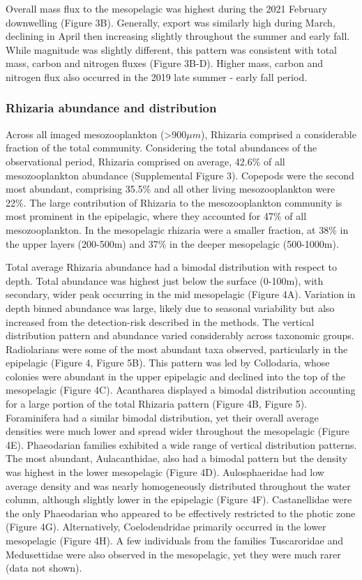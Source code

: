 \documentclass[
]{article}
\begin{document}
Overall mass flux to the mesopelagic was highest during the 2021
February downwelling (Figure 3B). Generally, export was similarly high
during March, declining in April then increasing slightly throughout the
summer and early fall. While magnitude was slightly different, this
pattern was consistent with total mass, carbon and nitrogen fluxes
(Figure 3B-D). Higher mass, carbon and nitrogen flux also occurred in
the 2019 late summer - early fall period.

\hypertarget{rhizaria-abundance-and-distribution}{%
\subsubsection{Rhizaria abundance and
distribution}\label{rhizaria-abundance-and-distribution}}

Across all imaged mesozooplankton (\textgreater900\(\mu m\)), Rhizaria
comprised a considerable fraction of the total community. Considering
the total abundances of the observational period, Rhizaria comprised on
average, 42.6\% of all mesozooplankton abundance (Supplemental Figure
3). Copepods were the second most abundant, comprising 35.5\% and all
other living mesozooplankton were 22\%. The large contribution of
Rhizaria to the mesozooplankton community is most prominent in the
epipelagic, where they accounted for 47\% of all mesozooplankton. In the
mesopelagic rhizaria were a smaller fraction, at 38\% in the upper
layers (200-500m) and 37\% in the deeper mesopelagic (500-1000m).

Total average Rhizaria abundance had a bimodal distribution with respect
to depth. Total abundance was highest just below the surface (0-100m),
with secondary, wider peak occurring in the mid mesopelagic (Figure 4A).
Variation in depth binned abundance was large, likely due to seasonal
variability but also increased from the detection-risk described in the
methods. The vertical distribution pattern and abundance varied
considerably across taxonomic groups. Radiolarians were some of the most
abundant taxa observed, particularly in the epipelagic (Figure 4, Figure
5B). This pattern was led by Collodaria, whose colonies were abundant in
the upper epipelagic and declined into the top of the mesopelagic
(Figure 4C). Acantharea displayed a bimodal distribution accounting for
a large portion of the total Rhizaria pattern (Figure 4B, Figure 5).
Foraminifera had a similar bimodal distribution, yet their overall
average densities were much lower and spread wider throughout the
mesopelagic (Figure 4E). Phaeodarian families exhibited a wide range of
vertical distribution patterns. The most abundant, Aulacanthidae, also
had a bimodal pattern but the density was highest in the lower
mesopelagic (Figure 4D). Aulosphaeridae had low average density and was
nearly homogeneously distributed throughout the water column, although
slightly lower in the epipelagic (Figure 4F). Castanellidae were the
only Phaeodarian who appeared to be effectively restricted to the photic
zone (Figure 4G). Alternatively, Coelodendridae primarily occurred in
the lower mesopelagic (Figure 4H). A few individuals from the families
Tuscaroridae and Medusettidae were also observed in the mesopelagic, yet
they were much rarer (data not shown).
\end{document}
